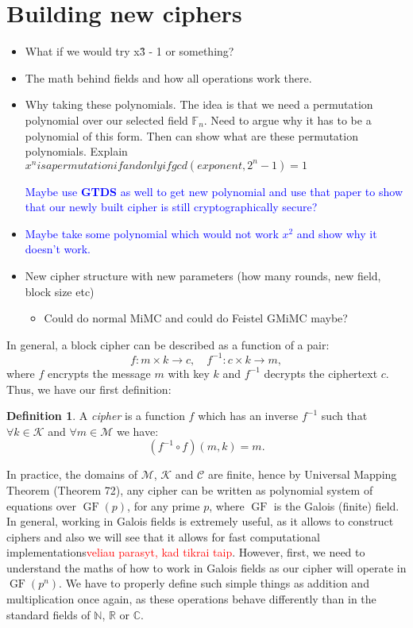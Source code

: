 \documentclass{Resources/UoBLab1}
\theoremstyle{definition}
\newtheorem{definition}[theorem]{Definition}
\begin{document}
\section{Building new ciphers}
\begin{itemize}
    \item What if we would try x\^ 3 - 1 or something?
    \item The math behind fields and how all operations work there.
    \item Why taking these polynomials. The idea is that we need a permutation polynomial over our selected field $\mathbb{F}_n$. Need to argue why it has to be a polynomial of this form. Then can show what are these permutation polynomials. Explain \(x^n is a permutation if and only if gcd(exponent, 2^n - 1) = 1\)\par
    \textcolor{blue}{Maybe use \textbf{GTDS} as well to get new polynomial and use that paper to show that our newly built cipher is still cryptographically secure?}
    \item \textcolor{blue}{Maybe take some polynomial which would not work $x^2$ and show why it doesn't work.}
    \item New cipher structure with new parameters (how many rounds, new field, block size etc)
    \begin{itemize}
        \item Could do normal MiMC and could do Feistel GMiMC maybe?
    \end{itemize}
\end{itemize}
\vspace{10pt}
In general, a block cipher can be described as a function of a pair:
\[
f : m \times k \to c,\quad f^{-1} : c \times k \to m,
\]
where $f$ encrypts the message $m$ with key $k$ and $f^{-1}$ decrypts the ciphertext $c$. Thus, we have our first definition:
\begin{definition}\label{def:1}
    A \textit{cipher} is a function $f$ which has an inverse $f^{-1}$ such that \(\forall k \in \mathcal{K}\) and \(\forall m \in \mathcal{M}\) we have:
    \[
        (f^{-1} \circ f)(m, k) = m.
    \]
\end{definition}
In practice, the domains of $\mathcal{M}$, $\mathcal{K}$ and $\mathcal{C}$ are finite, hence by Universal Mapping Theorem (Theorem 72\cite{CryptanalysisBook}), any cipher can be written as polynomial system of equations over $\operatorname{GF}(p)$, for any prime $p$, where $\operatorname{GF}$ is the Galois (finite) field. In general, working in Galois fields is extremely useful, as it allows to construct ciphers and also we will see that it allows for fast computational implementations\textcolor{red}{veliau parasyt, kad tikrai taip}. However, first, we need to understand the maths of how to work in Galois fields as our cipher will operate in $\operatorname{GF}(p^n)$. We have to properly define such simple things as addition and multiplication once again, as these operations behave differently than in the standard fields of $\mathbb{N}$, $\mathbb{R}$ or $\mathbb{C}$.
\end{document}
